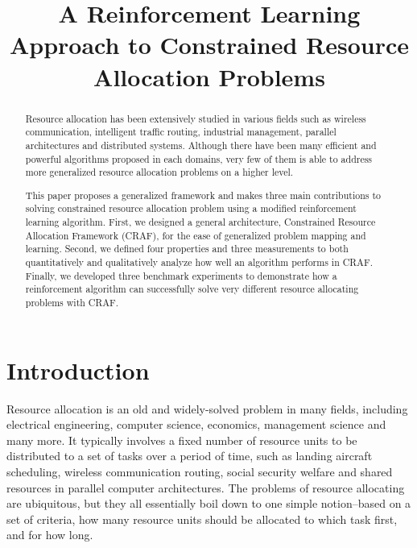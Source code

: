 \documentclass[conference]{IEEEtran}
\begin{document}
\onehalfspacing
\title{A Reinforcement Learning Approach to Constrained Resource Allocation Problems}

\author{
}
\maketitle

\begin{abstract}
Resource allocation has been extensively studied in various fields such as wireless communication, intelligent traffic routing, industrial management, parallel architectures and distributed systems. Although there have been many efficient and powerful algorithms proposed in each domains, very few of them is able to address more generalized resource allocation problems on a higher level.
	
This paper proposes a generalized framework and makes three main contributions to solving constrained resource allocation problem using a modified reinforcement learning algorithm. First, we designed a general architecture, Constrained Resource Allocation Framework (CRAF), for the ease of generalized problem mapping and learning. Second, we defined four properties and three measurements to both quantitatively and qualitatively analyze how well an algorithm performs in CRAF. Finally, we developed three benchmark experiments to demonstrate how a reinforcement algorithm can successfully solve very different resource allocating problems with CRAF.
\end{abstract}

\section{Introduction}
Resource allocation is an old and widely-solved problem in many fields, including electrical engineering, computer science, economics, management science and many more. It typically involves a fixed number of resource units to be distributed to a set of tasks over a period of time, such as landing aircraft scheduling, wireless communication routing, social security welfare and shared resources in parallel computer architectures. The problems of resource allocating are ubiquitous, but they all essentially boil down to one simple notion--based on a set of criteria, how many resource units should be allocated to which task first, and for how long.
\end{document}
